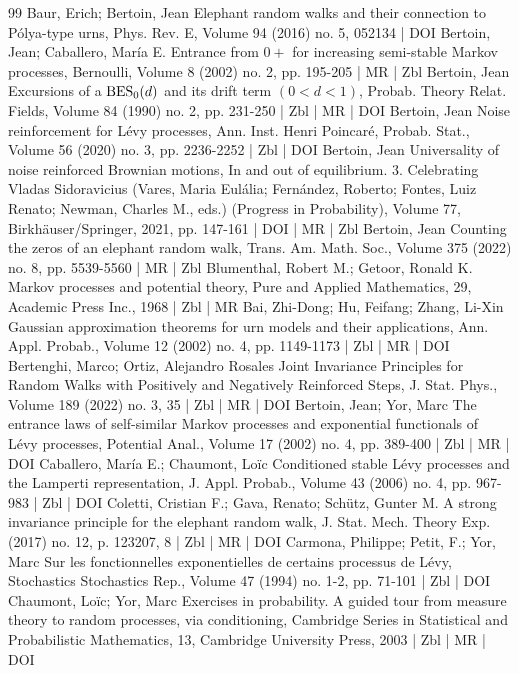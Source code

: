 \begin{thebibliography}{99}
Baur, Erich; Bertoin, Jean Elephant random walks and their connection to Pólya-type urns, Phys. Rev. E, Volume 94 (2016) no. 5, 052134 | DOI
Bertoin, Jean; Caballero, María E. Entrance from $0+$ for increasing semi-stable Markov processes, Bernoulli, Volume 8 (2002) no. 2, pp. 195-205 | MR | Zbl
Bertoin, Jean Excursions of a ${\rm {BES}}_0(d)$ and its drift term $(0<d<1)$, Probab. Theory Relat. Fields, Volume 84 (1990) no. 2, pp. 231-250 | Zbl | MR | DOI
Bertoin, Jean Noise reinforcement for Lévy processes, Ann. Inst. Henri Poincaré, Probab. Stat., Volume 56 (2020) no. 3, pp. 2236-2252 | Zbl | DOI
Bertoin, Jean Universality of noise reinforced Brownian motions, In and out of equilibrium. 3. Celebrating Vladas Sidoravicius (Vares, Maria Eulália; Fernández, Roberto; Fontes, Luiz Renato; Newman, Charles M., eds.) (Progress in Probability), Volume 77, Birkhäuser/Springer, 2021, pp. 147-161 | DOI | MR | Zbl
Bertoin, Jean Counting the zeros of an elephant random walk, Trans. Am. Math. Soc., Volume 375 (2022) no. 8, pp. 5539-5560 | MR | Zbl
Blumenthal, Robert M.; Getoor, Ronald K. Markov processes and potential theory, Pure and Applied Mathematics, 29, Academic Press Inc., 1968 | Zbl | MR
Bai, Zhi-Dong; Hu, Feifang; Zhang, Li-Xin Gaussian approximation theorems for urn models and their applications, Ann. Appl. Probab., Volume 12 (2002) no. 4, pp. 1149-1173 | Zbl | MR | DOI
Bertenghi, Marco; Ortiz, Alejandro Rosales Joint Invariance Principles for Random Walks with Positively and Negatively Reinforced Steps, J. Stat. Phys., Volume 189 (2022) no. 3, 35 | Zbl | MR | DOI
Bertoin, Jean; Yor, Marc The entrance laws of self-similar Markov processes and exponential functionals of Lévy processes, Potential Anal., Volume 17 (2002) no. 4, pp. 389-400 | Zbl | MR | DOI
Caballero, María E.; Chaumont, Loïc Conditioned stable Lévy processes and the Lamperti representation, J. Appl. Probab., Volume 43 (2006) no. 4, pp. 967-983 | Zbl | DOI
Coletti, Cristian F.; Gava, Renato; Schütz, Gunter M. A strong invariance principle for the elephant random walk, J. Stat. Mech. Theory Exp. (2017) no. 12, p. 123207, 8 | Zbl | MR | DOI
Carmona, Philippe; Petit, F.; Yor, Marc Sur les fonctionnelles exponentielles de certains processus de Lévy, Stochastics Stochastics Rep., Volume 47 (1994) no. 1-2, pp. 71-101 | Zbl | DOI
Chaumont, Loïc; Yor, Marc Exercises in probability. A guided tour from measure theory to random processes, via conditioning, Cambridge Series in Statistical and Probabilistic Mathematics, 13, Cambridge University Press, 2003 | Zbl | MR | DOI

\end{thebibliography}
